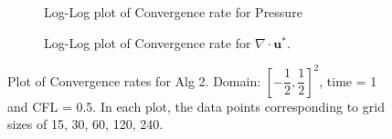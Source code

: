\begin{figure}[H]
	\centering
	\begin{subfigure}[t]{4.5in}
		\centering
		\caption{Log-Log plot of Convergence rate for Pressure}\label{fig:6.19a}		
	\end{subfigure}
	\quad
	\begin{subfigure}[t]{4.5in}
		\centering
		\caption{Log-Log plot of Convergence rate for $\nabla \cdot \textbf{u}^*$. }\label{fig:6.19b}
	\end{subfigure}
	\caption{Plot of Convergence rates for Alg 2. Domain:  $[-\dfrac{1}{2}, \dfrac{1}{2}]^2$, time = 1 and CFL = 0.5. In each plot, the data points corresponding to grid sizes of 15, 30, 60, 120, 240.}\label{fig:6.16}
\end{figure}

